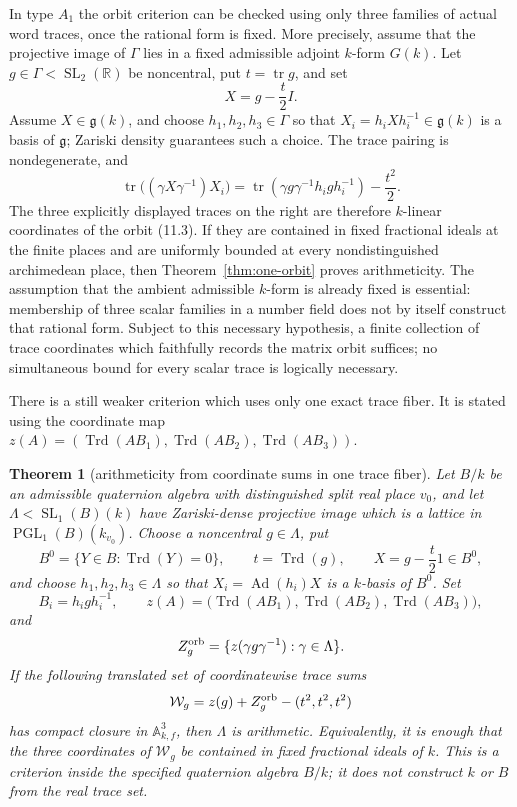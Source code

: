 \documentclass[11pt,reqno]{amsart}
\newtheorem{theorem}{Theorem}[section]
\theoremstyle{definition}
\theoremstyle{remark}
\newcommand{\R}{\mathbb R}
\newcommand{\Tr}{\operatorname{tr}}
\newcommand{\Trd}{\operatorname{Trd}}
\newcommand{\SL}{\operatorname{SL}}
\newcommand{\PGL}{\operatorname{PGL}}
\newcommand{\Ad}{\operatorname{Ad}}
\begin{document}
In type \(A_1\) the orbit criterion can be checked using only three families
of actual word traces, once the rational form is fixed.  More precisely,
assume that the projective image of \(\Gamma\) lies in a fixed admissible
adjoint \(k\)-form \(G(k)\).  Let \(g\in\Gamma<\SL_2(\R)\) be noncentral, put
\(t=\Tr g\), and set
\[
 X=g-\frac t2I.
\]
Assume \(X\in\mathfrak g(k)\), and choose \(h_1,h_2,h_3\in\Gamma\) so that
\(X_i=h_iXh_i^{-1}\in\mathfrak g(k)\) is a basis of \(\mathfrak g\);
Zariski density guarantees such a choice.  The trace pairing is
nondegenerate, and
\[
 \Tr\bigl((\gamma X\gamma^{-1})X_i\bigr)
 =\Tr(\gamma g\gamma^{-1}h_i g h_i^{-1})-\frac{t^2}{2}.
\tag{11.4}
\]
The three explicitly displayed traces on the right are therefore
\(k\)-linear coordinates
of the orbit (11.3).  If they are contained in fixed fractional ideals at
the finite places and are uniformly bounded at every nondistinguished
archimedean place, then Theorem~\ref{thm:one-orbit} proves arithmeticity.
The assumption that the ambient admissible \(k\)-form is already fixed is
essential: membership of three scalar families in a number field does not by
itself construct that rational form.  Subject to this necessary hypothesis,
a finite collection of trace coordinates which faithfully records the matrix
orbit suffices; no simultaneous bound for every scalar trace is logically
necessary.

There is a still weaker criterion which uses only one exact trace fiber.  It
is stated using the coordinate map
\(z(A)=(\Trd(AB_1),\Trd(AB_2),\Trd(AB_3))\).

\begin{theorem}[arithmeticity from coordinate sums in one trace fiber]
\label{thm:one-fiber-window}
Let \(B/k\) be an admissible quaternion algebra with distinguished split
real place \(v_0\), and let \(\Lambda<\SL_1(B)(k)\) have Zariski-dense
projective image which is a lattice in
\(\PGL_1(B)(k_{v_0})\).  Choose a noncentral \(g\in\Lambda\), put
\[
 B^0=\{Y\in B:\Trd(Y)=0\},\qquad
 t=\Trd(g),\qquad X=g-\frac t2 1\in B^0,
\]
and choose \(h_1,h_2,h_3\in\Lambda\) so that
\(X_i=\Ad(h_i)X\) is a \(k\)-basis of \(B^0\).  Set
\[
 B_i=h_i g h_i^{-1},\qquad
 z(A)=\bigl(\Trd(AB_1),\Trd(AB_2),\Trd(AB_3)\bigr),
\]
and
\[
 Z_g^{\rm orb}=\{z(\gamma g\gamma^{-1}):\gamma\in\Lambda\}.
\]
If the following translated set of coordinatewise trace sums
\[
 \mathcal W_g=z(g)+Z_g^{\rm orb}-(t^2,t^2,t^2)
\]
has compact closure in \(\mathbb A_{k,f}^3\), then \(\Lambda\) is
arithmetic.  Equivalently, it is enough that the three coordinates of
\(\mathcal W_g\) be contained in fixed fractional ideals of \(k\).  This is
a criterion inside the specified quaternion algebra \(B/k\); it does not
construct \(k\) or \(B\) from the real trace set.
\end{theorem}
\end{document}
